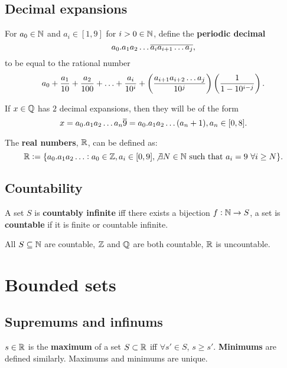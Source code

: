 \subsection{Decimal expansions}
\begin{definition}
    For $a_0\in\mathbb{N}$ and $a_i\in[1,9]$ for $i>0\in\mathbb{N}$, define the \textbf{periodic decimal} \[
        a_0.a_1a_2\ldots\overline{a_ia_{i+1}\ldots a_j}
    \textcolor{black}{,}
    \] to be equal to the rational number \[
        a_0 + \frac{a_1}{10} + \frac{a_2}{100} + \ldots + \frac{a_i}{10^i} + \br{\frac{a_{i+1}a_{i+2}\ldots a_j}{10^j}}\br{\frac{1}{1-10^{i-j}}}
    \textcolor{black}{.}
    \]
\end{definition}

\begin{theorem}
    If $x\in\mathbb{Q}$ has $2$ decimal expansions, then they will be of the form \[
        x=a_0.a_1a_2\ldots a_n\overline{9} = a_0.a_1a_2\ldots(a_n+1), a_n\in[0,8]
    \textcolor{black}{.}    
    \]
\end{theorem}

\begin{definition}
    The \textbf{real numbers}, $\mathbb{R}$, can be defined as: \[
        \mathbb{R}:= \{a_0.a_1a_2\ldots : a_0\in\mathbb{Z}, a_i\in[0,9],\not\exists N\in\mathbb{N} \ \text{\textcolor{black}{such that }} a_i=9 \ \forall i\geq N\}
    \textcolor{black}{.}
    \]
\end{definition}

\subsection{Countability}

\begin{definition}[Countability]
    A set $S$ is \textbf{countably infinite} iff there exists a bijection $f:\mathbb{N}\rightarrow S$, a set is \textbf{countable} if it is finite or countable infinite.
\end{definition}

\begin{theorem}
    All $S\subseteq\mathbb{N}$ are countable, $\mathbb{Z}$ and $\mathbb{Q}$ are both countable, $\mathbb{R}$ is uncountable.
\end{theorem}

\section{Bounded sets}

\subsection{Supremums and infinums}
\begin{definition}
    $s\in\mathbb{R}$ is the \textbf{maximum} of a set $S\subset\mathbb{R}$ iff $\forall s'\in S$, $s\geq s'$. \textbf{Minimums} are defined similarly. Maximums and minimums are unique.
\end{definition}

